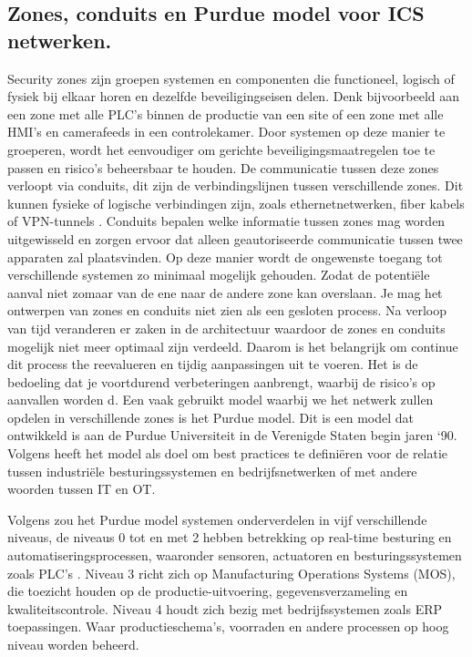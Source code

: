 \subsection{Zones, conduits en Purdue model voor ICS netwerken.}
Security zones zijn groepen systemen en componenten die functioneel, logisch of fysiek bij elkaar horen en dezelfde beveiligingseisen delen. Denk bijvoorbeeld aan een zone met alle PLC’s binnen de productie van een site of een zone met alle HMI’s en camerafeeds in een controlekamer. Door systemen op deze manier te groeperen, wordt het eenvoudiger om gerichte beveiligingsmaatregelen toe te passen en risico’s beheersbaar te houden. De communicatie tussen deze zones verloopt via conduits, dit zijn de verbindingslijnen tussen verschillende zones. Dit kunnen fysieke of logische verbindingen zijn, zoals ethernetnetwerken, fiber kabels of VPN-tunnels . Conduits bepalen welke informatie tussen zones mag worden uitgewisseld en zorgen ervoor dat alleen geautoriseerde communicatie tussen twee apparaten zal plaatsvinden. Op deze manier wordt de ongewenste toegang tot verschillende systemen zo minimaal mogelijk gehouden. Zodat de potentiële aanval niet zomaar van de ene naar de andere zone kan overslaan. \autocite{Dragos2023}
Je mag het ontwerpen van zones en conduits niet zien als een gesloten process. Na verloop van tijd veranderen er zaken in de architectuur waardoor de zones en conduits mogelijk niet meer optimaal zijn verdeeld. Daarom is het belangrijk om continue dit process the reevalueren en tijdig aanpassingen uit te voeren. Het is de bedoeling dat je voortdurend verbeteringen aanbrengt, waarbij de risico's op aanvallen worden d. \autocite{Incibe2018}
Een vaak gebruikt model waarbij we het netwerk zullen opdelen in verschillende zones is het Purdue model. Dit is een model dat ontwikkeld is aan de Purdue Universiteit in de Verenigde Staten begin jaren `90. Volgens \textcite{Mathezer2021}heeft het model als doel om best practices te definiëren voor de relatie tussen industriële besturingssystemen en bedrijfsnetwerken of met andere woorden tussen IT en OT. 

Volgens \textcite{Commers2025} zou het Purdue model systemen onderverdelen in vijf verschillende niveaus, de niveaus 0 tot en met 2 hebben betrekking op real-time besturing en automatiseringsprocessen, waaronder sensoren, actuatoren en besturingssystemen zoals PLC’s . Niveau 3 richt zich op Manufacturing Operations Systems (MOS), die toezicht houden op de productie-uitvoering, gegevensverzameling en kwaliteitscontrole. Niveau 4 houdt zich bezig met bedrijfssystemen zoals ERP toepassingen. Waar productieschema's, voorraden en andere processen op hoog niveau worden beheerd.

